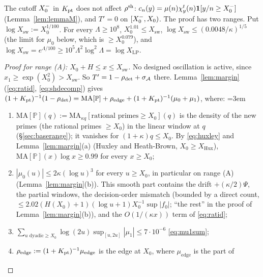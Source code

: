 The cutoff $X_0^{-}$ in $K_{\mathrm{pt}}$ does not affect $\rho^{\mathrm{sh}}$: $c_n(y)=\mu(n)\chi^t_y(n)\mathbf 1[y/n\ge X_0^{-}]$ (Lemma~\ref{lem:lemmaM}),
and $T'=0$ on $[X_0^{-},X_0)$. The proof has two ranges. Put $\log X_{\mathrm{sw}}:=X_0^{1/100}$. For every $\Lambda\ge10^8$,
$X_0^{1.01}\le X_{\mathrm{sw}}$, $\log X_{\mathrm{sw}}\le(0.0048/\kappa)^{1/5}$ (the limit for $\mu_0$ below, which is
$\ge X_0^{0.079}$), and $\log X_{\mathrm{sw}}=e^{\Lambda/100}\ge10^5\Lambda^2\log^2\Lambda=\log X_{\mathrm{LP}}$.

\begin{proof}[Proof for range \textup{(A)}: $X_0+H\le x\le X_{\mathrm{sw}}$]
No designed oscillation is active, since $x_1\ge\exp(X_0^2)>X_{\mathrm{sw}}$. So $T'=1-\rho_{\mathrm{det}}+\sigma_{\mathcal{A}}$ there.
Lemma~\ref{lem:margin} (\eqref{eq:ratid}, \eqref{eq:shdecomp}) gives
$(1+K_{\mathrm{pt}})^{-1}(1-\rho_{\mathrm{det}})=\mathrm{MA}[\mathbb P]+\rho_{\mathrm{edge}}+(1+K_{\mathrm{pt}})^{-1}(\mu_0+\mu_1)$, where:
\begingroup\emergencystretch=3em
\begin{enumerate}[label=(\alph*)]
\item $\mathrm{MA}[\mathbb P](q):=\mathrm{MA}_{\kappa q}[\text{rational primes}\ge X_0](q)$ is the density of the new primes (the
  rational primes $\ge X_0$) in the linear window at $q$ (\S\ref{sec:baserange}); it vanishes for $(1+\kappa)q\le X_0$. By
  \eqref{eq:huxley} and Lemma~\ref{lem:margin}(a) (Huxley and Heath-Brown, $X_0\ge X_{\mathrm{Hux}}$),
  $\mathrm{MA}[\mathbb P](x)\log x\ge0.99$ for every $x\ge X_0$;
\item $|\mu_0(u)|\le2\kappa(\log u)^3$ for every $u\ge X_0$, in particular on range (A)
  (Lemma~\ref{lem:margin}(b)). This smooth part contains the drift $+(\kappa/2)\Psi$, the partial windows, the decision-order
  mismatch (bounded by a direct count, $\le2.02(H(X_0)+1)(\log u+1)X_0^{-1}\sup|f_0|$; ``the rest'' in the proof of
  Lemma~\ref{lem:margin}(b)), and the $O(1/(\kappa x))$ term of \eqref{eq:ratid};
\item $\sum_{u\text{ dyadic}\ge X_0}\log(2u)\sup_{[u,2u]}|\mu_1|\le7\cdot10^{-6}$ \eqref{eq:mu1sum};
\item $\rho_{\mathrm{edge}}:=(1+K_{\mathrm{pt}})^{-1}\mu_{\mathrm{edge}}$ is the edge at $X_0$, where $\mu_{\mathrm{edge}}$ is the part of

\end{enumerate}
\end{proof}
